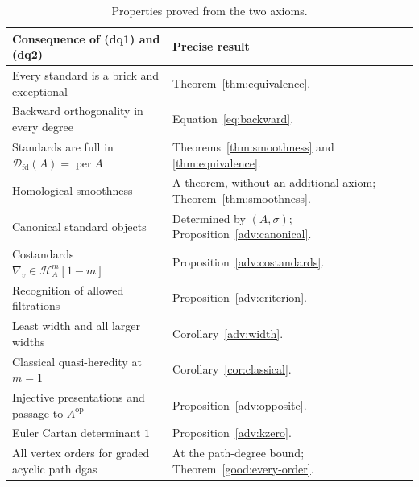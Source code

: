 \documentclass[11pt,a4paper]{article}
\newcommand{\D}{\mathcal D}
\renewcommand{\H}{\mathcal H}
\newcommand{\op}{\mathrm{op}}
\newcommand{\costd}{\nabla}
\DeclareMathOperator{\fd}{fd}
\DeclareMathOperator{\per}{per}
\theoremstyle{plain}
\theoremstyle{definition}
\numberwithin{equation}{section}
\begin{document}
\begin{table}[htbp]
\centering\small
\begin{tabularx}{\linewidth}{@{}>{\raggedright\arraybackslash}p{.42\linewidth}>{\raggedright\arraybackslash}X@{}}
\toprule
Consequence of (dq1) and (dq2) & Precise result\\\midrule
Every standard is a brick and exceptional & Theorem~\ref{thm:equivalence}.\\
Backward orthogonality in every degree & Equation~\eqref{eq:backward}.\\
Standards are full in $\D_{\fd}(A)=\per A$ & Theorems~\ref{thm:smoothness} and \ref{thm:equivalence}.\\
Homological smoothness & A theorem, without an additional axiom;
Theorem~\ref{thm:smoothness}.\\
Canonical standard objects & Determined by $(A,\sigma)$;
Proposition~\ref{adv:canonical}.\\
Costandards $\costd_v\in\H_A^m[1-m]$ & Proposition~\ref{adv:costandards}.\\
Recognition of allowed filtrations & Proposition~\ref{adv:criterion}.\\
Least width and all larger widths & Corollary~\ref{adv:width}.\\
Classical quasi-heredity at $m=1$ & Corollary~\ref{cor:classical}.\\
Injective presentations and passage to $A^{\op}$ & Proposition~\ref{adv:opposite}.\\
Euler Cartan determinant $1$ & Proposition~\ref{adv:kzero}.\\
All vertex orders for graded acyclic path dgas & At the path-degree
bound; Theorem~\ref{good:every-order}.\\
\bottomrule
\end{tabularx}
\caption{Properties proved from the two axioms.}
\label{tab:consequences}
\end{table}
\end{document}

